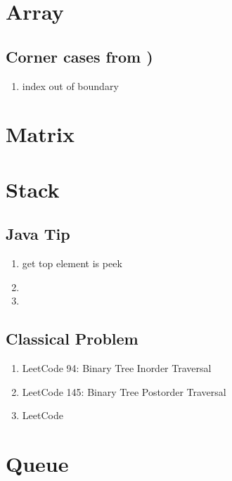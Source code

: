 \chapter{ Array }

\section {  Corner cases from )}
\begin{enumerate}
    \item index out of boundary 


\end{enumerate}

\chapter{ Matrix }

\chapter{ Stack }

\section{ Java Tip }

\begin{enumerate}
    \item get top element is peek
    \item  
    \item  

\end{enumerate}

\section{ Classical Problem }

\begin{enumerate}
    \item LeetCode 94: Binary Tree Inorder Traversal 
    \item LeetCode 145: Binary Tree Postorder Traversal
    \item LeetCode

\end{enumerate}

\chapter{ Queue }

